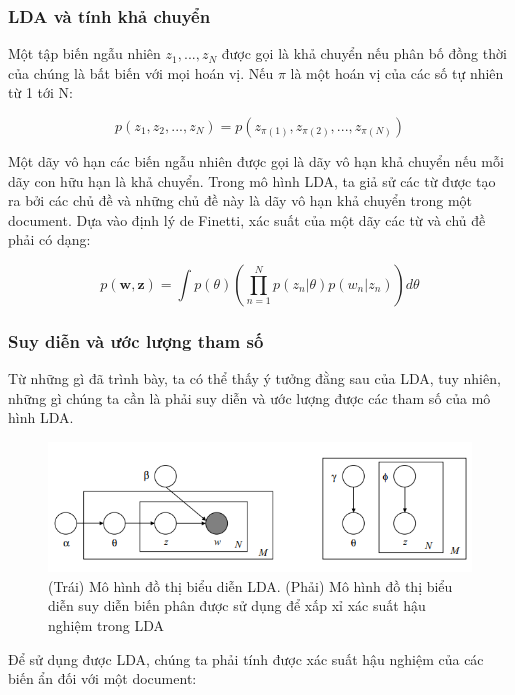 \documentclass[12pt,a4paper]{article}
\begin{document}
\subsubsection{LDA và tính khả chuyển}
Một tập biến ngẫu nhiên ${z_1,..., z_N}$ được gọi là khả chuyển nếu phân bố đồng thời của chúng là bất biến với mọi hoán vị. Nếu $\pi$ là một hoán vị của các số tự nhiên từ 1 tới N:

\begin{equation} 
p(z_1, z_2,..., z_N) = p(z_{\pi (1)}, z_{\pi (2)},..., z_{\pi (N)})
\end{equation}


Một dãy vô hạn các biến ngẫu nhiên được gọi là dãy vô hạn khả chuyển nếu mỗi dãy con hữu hạn là khả chuyển. Trong mô hình LDA, ta giả sử các từ được tạo ra bởi các chủ đề và những chủ đề này là dãy vô hạn khả chuyển trong một document. Dựa vào định lý de Finetti, xác suất của một dãy các từ và chủ đề phải có dạng:

\begin{equation} 
p(\textbf{w}, \textbf{z}) = \int p(\theta) \left(\prod_{n=1}^{N} p(z_n | \theta) p(w_n | z_n) \right)d\theta
\end{equation}

\subsubsection{Suy diễn và ước lượng tham số}

Từ những gì đã trình bày, ta có thể thấy ý tưởng đằng sau của LDA, tuy nhiên, những gì chúng ta cần là phải suy diễn và ước lượng được các tham số của mô hình LDA.

\begin{figure}[h]
    \centering
    \captionsetup{justification=centering}
    \includegraphics[width=.9\textwidth]{varitional}
    \caption{(Trái) Mô hình đồ thị biểu diễn LDA. (Phải) Mô hình đồ thị biểu diễn suy diễn biến phân được sử dụng để xấp xỉ xác suất hậu nghiệm trong LDA}
    \label{fig:varitional}
\end{figure}

\noindent
Để sử dụng được LDA, chúng ta phải tính được xác suất hậu nghiệm của các biến ẩn đối với một document:
\end{document}
